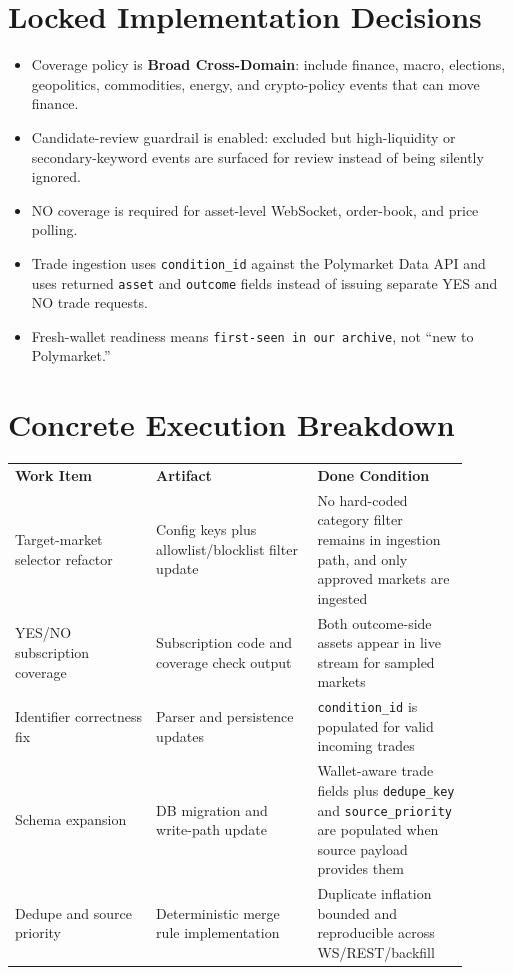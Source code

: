 \documentclass{article}
\begin{document}
\section*{Locked Implementation Decisions}
\begin{itemize}
\item Coverage policy is \textbf{Broad Cross-Domain}: include finance, macro, elections, geopolitics, commodities, energy, and crypto-policy events that can move finance.
\item Candidate-review guardrail is enabled: excluded but high-liquidity or secondary-keyword events are surfaced for review instead of being silently ignored.
\item NO coverage is required for asset-level WebSocket, order-book, and price polling.
\item Trade ingestion uses \texttt{condition\_id} against the Polymarket Data API and uses returned \texttt{asset} and \texttt{outcome} fields instead of issuing separate YES and NO trade requests.
\item Fresh-wallet readiness means \texttt{first-seen in our archive}, not ``new to Polymarket.''
\end{itemize}

\section*{Concrete Execution Breakdown}
\begin{longtable}{p{0.28\linewidth}p{0.32\linewidth}p{0.30\linewidth}}
\textbf{Work Item} & \textbf{Artifact} & \textbf{Done Condition} \\
Target-market selector refactor & Config keys plus allowlist/blocklist filter update & No hard-coded category filter remains in ingestion path, and only approved markets are ingested \\
YES/NO subscription coverage & Subscription code and coverage check output & Both outcome-side assets appear in live stream for sampled markets \\
Identifier correctness fix & Parser and persistence updates & \texttt{condition\_id} is populated for valid incoming trades \\
Schema expansion & DB migration and write-path update & Wallet-aware trade fields plus \texttt{dedupe\_key} and \texttt{source\_priority} are populated when source payload provides them \\
Dedupe and source priority & Deterministic merge rule implementation & Duplicate inflation bounded and reproducible across WS/REST/backfill \\
\end{longtable}
\end{document}
